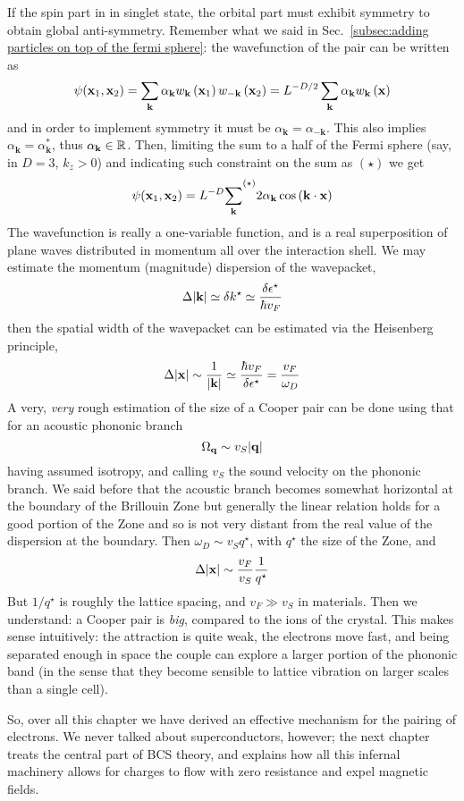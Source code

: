 If the spin part in in singlet state, the orbital part must exhibit symmetry to obtain global anti-symmetry. Remember what we said in Sec.~\ref{subsec:adding particles on top of the fermi sphere}: the wavefunction of the pair can be written as
\[
	\psi(\mathbf{x}_1,\mathbf{x}_2) =  \sum_\mathbf{k} \alpha_\mathbf{k} w_\mathbf{k} \left({\mathbf{x}_1}\right) w_{-\mathbf{k}} \left({\mathbf{x}_2}\right) = L^{-D/2} \sum_\mathbf{k} \alpha_\mathbf{k} w_\mathbf{k} \left({\mathbf{x}}\right)
\]
and in order to implement symmetry it must be $\alpha_\mathbf{k} = \alpha_{-\mathbf{k}}$. This also implies $\alpha_\mathbf{k}=\alpha_\mathbf{k}^*$, thus $\alpha_\mathbf{k} \in \mathbb{R}$. Then, limiting the sum to a half of the Fermi sphere (say, in $D=3$, $k_z > 0$) and indicating such constraint on the sum as $(\star)$ we get
\[
	\psi(\mathbf{x}_1,\mathbf{x}_2) = L^{-D} {\sum_\mathbf{k}^{}}^{(\star)} 2 \alpha_\mathbf{k} \cos\left({\mathbf{k}\cdot\mathbf{x}}\right)
\]
The wavefunction is really a one-variable function, and is a real superposition of plane waves distributed in momentum all over the interaction shell. We may estimate the momentum (magnitude) dispersion of the wavepacket,
\[
	\Delta \abs{\mathbf{k}} \simeq \delta k^\star \simeq \frac{\delta\epsilon^\star}{\hbar v_F}
\]
then the spatial width of the wavepacket can be estimated via the Heisenberg principle,
\[
	\Delta\abs{\mathbf{x}} \sim \frac{1}{\abs{\mathbf{k}}} \simeq \frac{\hbar v_F}{\delta\epsilon^\star} = \frac{v_F}{\omega_D}
\]
A very, \textit{very} rough estimation of the size of a Cooper pair can be done using that for an acoustic phononic branch
\[
	\Omega_\mathbf{q} \sim v_S \abs{\mathbf{q}}
\]
having assumed isotropy, and calling $v_S$ the sound velocity on the phononic branch. We said before that the acoustic branch becomes somewhat horizontal at the boundary of the Brillouin Zone but generally the linear relation holds for a good portion of the Zone and so is not very distant from the real value of the dispersion at the boundary. Then $\omega_D \sim v_S q^\star$, with $q^\star$ the size of the Zone, and
\[
	\Delta\abs{\mathbf{x}} \sim \frac{v_F}{v_S} \frac{1}{q^\star}
\]
But $1/q^\star$ is roughly the lattice spacing, and $v_F \gg v_S$ in materials. Then we understand: a Cooper pair is \textit{big}, compared to the ions of the crystal. This makes sense intuitively: the attraction is quite weak, the electrons move fast, and being separated enough in space the couple can explore a larger portion of the phononic band (in the sense that they become sensible to lattice vibration on larger scales than a single cell).

So, over all this chapter we have derived an effective mechanism for the pairing of electrons. We never talked about superconductors, however; the next chapter treats the central part of BCS theory, and explains how all this infernal machinery allows for charges to flow with zero resistance and expel magnetic fields.